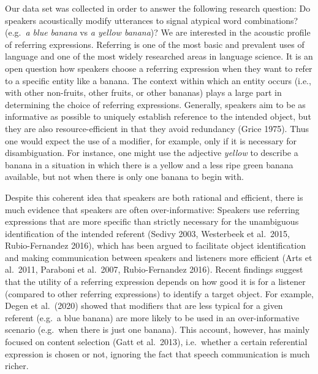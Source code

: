\documentclass[
  english,
  man,floatsintext]{apa6}
\begin{document}
Our data set was collected in order to answer the following research question: Do speakers acoustically modify utterances to signal atypical word combinations? (e.g.~\emph{a blue banana} vs \emph{a yellow banana})?
We are interested in the acoustic profile of referring expressions.
Referring is one of the most basic and prevalent uses of language and one of the most widely researched areas in language science.
It is an open question how speakers choose a referring expression when they want to refer to a specific entity like a banana.
The context within which an entity occurs (i.e., with other non-fruits, other fruits, or other bananas) plays a large part in determining the choice of referring expressions.
Generally, speakers aim to be as informative as possible to uniquely establish reference to the intended object, but they are also resource-efficient in that they avoid redundancy (Grice 1975).
Thus one would expect the use of a modifier, for example, only if it is necessary for disambiguation.
For instance, one might use the adjective \emph{yellow} to describe a banana in a situation in which there is a yellow and a less ripe green banana available, but not when there is only one banana to begin with.

Despite this coherent idea that speakers are both rational and efficient, there is much evidence that speakers are often over-informative: Speakers use referring expressions that are more specific than strictly necessary for the unambiguous identification of the intended referent (Sedivy 2003, Westerbeek et al.~2015, Rubio-Fernandez 2016), which has been argued to facilitate object identification and making communication between speakers and listeners more efficient (Arts et al.~2011, Paraboni et al.~2007, Rubio-Fernandez 2016).
Recent findings suggest that the utility of a referring expression depends on how good it is for a listener (compared to other referring expressions) to identify a target object.
For example, Degen et al.~(2020) showed that modifiers that are less typical for a given referent (e.g.~a blue banana) are more likely to be used in an over-informative scenario (e.g.~when there is just one banana).
This account, however, has mainly focused on content selection (Gatt et al.~2013), i.e.~whether a certain referential expression is chosen or not, ignoring the fact that speech communication is much richer.
\end{document}
